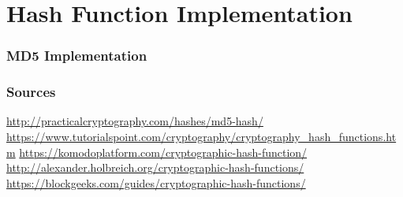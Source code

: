 \documentclass{beamer}
\begin{document}
\section{Hash Function Implementation}

\begin{frame}
\frametitle{MD5 Implementation}

\end{frame}

\begin{frame}
\frametitle{Sources}
\begin{thebibliography}{}
	\beamertemplatebookbibitems
	\url{http://practicalcryptography.com/hashes/md5-hash/}
	\url{https://www.tutorialspoint.com/cryptography/cryptography_hash_functions.htm}
	\url{https://komodoplatform.com/cryptographic-hash-function/}
	\url{http://alexander.holbreich.org/cryptographic-hash-functions/}
	\url{https://blockgeeks.com/guides/cryptographic-hash-functions/}
\end{thebibliography}
\end{frame}



%		
\end{document}
